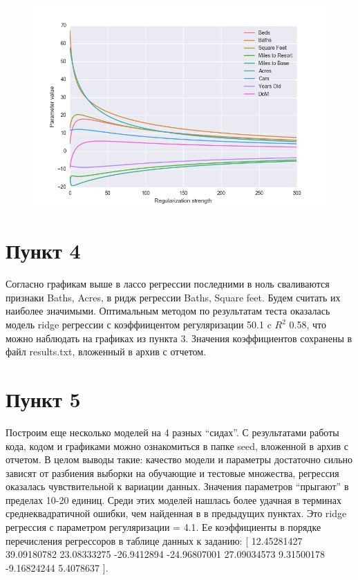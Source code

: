 \documentclass[a4paper, 12pt, oneside]{scrartcl}
\numberwithin{equation}{section}
\numberwithin{table}{section}
\numberwithin{figure}{section}
\begin{document}
\begin{figure}[H]
    \centering
    \includegraphics[width=\linewidth]{Ridge_params.png}
\end{figure}

\newpage
\section*{Пункт 4}
Согласно графикам выше в лассо регрессии последними в ноль сваливаются признаки Baths, Acres, в ридж регрессии Baths, Square feet. Будем считать их 
наиболее значимыми. Оптимальным методом по результатам теста оказалась модель ridge регрессии с коэффиицентом регуляризации 50.1 c $ R^2 $ 
0.58, что можно наблюдать на графиках из пункта 3. Значения коэффициентов сохранены в файл results.txt, вложенный в архив с отчетом. 

\section*{Пункт 5}
Построим еще несколько моделей на 4 разных “сидах”. С результатами работы кода, кодом
и графиками можно ознакомиться в папке seed, вложенной в архив с отчетом. В целом выводы 
такие: качество модели и параметры достаточно сильно зависят от разбиения выборки на 
обучающие и тестовые множества, регрессия оказалась чувствительной к вариации данных. 
Значения параметров “прыгают” в пределах 10-20 единиц. Среди 
этих моделей нашлась более удачная в терминах среднеквадратичной ошибки, 
чем найденная в в предыдущих пунктах. Это ridge регрессия с параметром регуляризации = 4.1.
Ее коэффициенты в порядке перечисления регрессоров в таблице данных к заданию: 
[ 12.45281427  39.09180782  23.08333275 -26.9412894  -24.96807001
27.09034573   9.31500178  -9.16824244   5.4078637 ].
\end{document}
